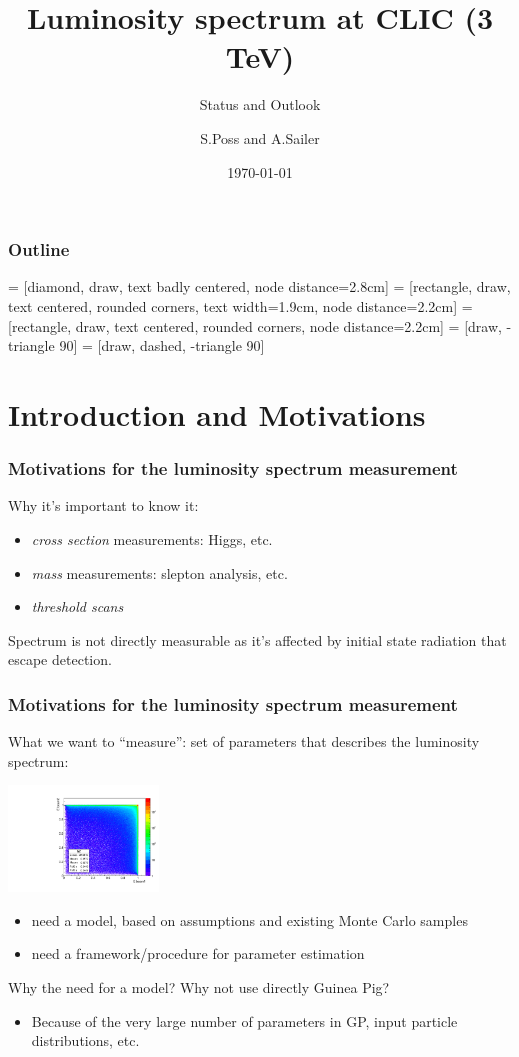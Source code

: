 \documentclass{beamer}
\author{S.Poss and A.Sailer}
\institute{CERN}
\date{\today}
\title{Luminosity spectrum at CLIC (3 TeV)}
\subtitle{Status and Outlook}
\begin{document}
\begin{frame}
\titlepage
\end{frame}
\begin{frame}
\frametitle{Outline}
\tableofcontents
\end{frame}
 = [diamond, draw, text badly centered, node distance=2.8cm]
 = [rectangle, draw, text centered, rounded corners, text width=1.9cm, node distance=2.2cm]
 = [rectangle, draw, text centered, rounded corners, node distance=2.2cm]
 = [draw, -triangle 90]
 = [draw, dashed, -triangle 90]
\section{Introduction and Motivations}
\begin{frame}
\frametitle{Motivations for the luminosity spectrum measurement}
Why it's important to know it:
\begin{itemize}
\item \emph{cross section} measurements: Higgs, etc.
\item \emph{mass} measurements: slepton analysis, etc.
\item \emph{threshold scans}
\end{itemize}
Spectrum is not directly measurable as it's affected by initial state radiation
that escape detection.
\end{frame}

\begin{frame}
\frametitle{Motivations for the luminosity spectrum measurement}
What we want to ``measure'': set of parameters that describes the luminosity
spectrum:
\begin{center}
\includegraphics[width=4cm]{E1_E2_spread_strahlung.pdf}
\end{center}
\begin{itemize}
\item need a \alert{model}, based on assumptions and existing Monte
Carlo samples
\item need a framework/procedure for parameter estimation
\end{itemize}

Why the need for a model? Why not use directly Guinea Pig?
\begin{itemize}
  \item Because of the very large number of parameters in GP, input particle
  distributions, etc.
\end{itemize}
\end{frame}
\end{document}

